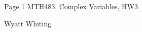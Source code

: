 \documentclass{article}
\begin{document}
\large %


{\Large Page 1 %
\hfill  MTH483, Complex Variables, HW3}

\begin{center}
{\Large Wyatt Whiting}
\end{center}
\vspace{0.05in}

\end{document}
